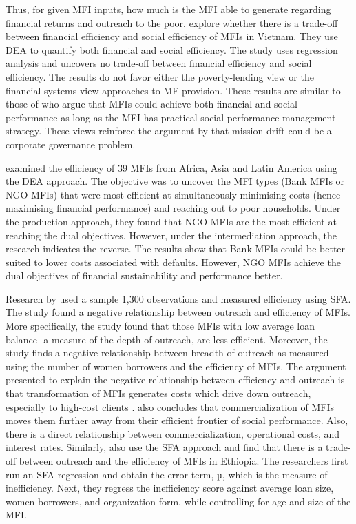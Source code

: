 \documentclass[a4paper,nobind]{templates/ociamthesis}
\begin{document}
Thus, for given MFI inputs, how much is the MFI able to generate regarding financial returns and outreach to the poor. \textcite{lebovics2016financial} explore whether there is a trade-off between financial efficiency and social efficiency of MFIs in Vietnam. They use DEA to quantify both financial and social efficiency. The study uses regression analysis and uncovers no trade-off between financial efficiency and social efficiency. The results do not favor either the poverty-lending view or the financial-systems view approaches to MF provision. These results are similar to those of \textcite{bedecarrats2012combining} who argue that MFIs could achieve both financial and social performance as long as the MFI has practical social performance management strategy. These views reinforce the argument by \textcite{abeysekera2014sustainability} that mission drift could be a corporate governance problem.

\textcite{haq2010efficiency} examined the efficiency of 39 MFIs from Africa, Asia and Latin America using the DEA approach. The objective was to uncover the MFI types (Bank MFIs or NGO MFIs) that were most efficient at simultaneously minimising costs (hence maximising financial performance) and reaching out to poor households. Under the production approach, they found that NGO MFIs are the most efficient at reaching the dual objectives. However, under the intermediation approach, the research indicates the reverse. The results show that Bank MFIs could be better suited to lower costs associated with defaults. However, NGO MFIs achieve the dual objectives of financial sustainability and performance better.

Research by \textcite{hermes2011outreach} used a sample 1,300 observations and measured efficiency using SFA. The study found a negative relationship between outreach and efficiency of MFIs. More specifically, the study found that those MFIs with low average loan balance- a measure of the depth of outreach, are less efficient. Moreover, the study finds a negative relationship between breadth of outreach as measured using the number of women borrowers and the efficiency of MFIs. The argument presented to explain the negative relationship between efficiency and outreach is that transformation of MFIs generates costs which drive down outreach, especially to high-cost clients \autocite{cull2011does}. \textcite{roberts2013endogeneity} also concludes that commercialization of MFIs moves them further away from their efficient frontier of social performance. Also, there is a direct relationship between commercialization, operational costs, and interest rates.
Similarly, \textcite{abate2014cost} also use the SFA approach and find that there is a trade-off between outreach and the efficiency of MFIs in Ethiopia. The researchers first run an SFA regression and obtain the error term, µ, which is the measure of inefficiency. Next, they regress the inefficiency score against average loan size, women borrowers, and organization form, while controlling for age and size of the MFI.
\end{document}
